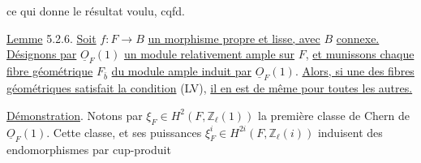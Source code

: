 \begin{center}
\end{center}
ce qui donne le résultat voulu, cqfd.



\underline{Lemme} 5.2.6. \underline{Soit} $f : F \longrightarrow B$ \underline{un morphisme propre et lisse, avec} $B$ \underline{connexe. Désignons par} $\underline{O}_F(1)$ \underline{un module relativement ample sur} $F$, \underline{et munissons chaque fibre géométrique} $F_{\bar{b}}$ \underline{du module ample induit par} $\underline{O}_F(1)$. \underline{Alors, si une des fibres géométriques satisfait la condition} (LV), \underline{il en est de même pour toutes les autres.}

\underline{Démonstration}. Notons par $\xi_F \in H^2(F,\mathbb{Z}_\ell(1))$ la première classe de Chern de $\underline{O}_F(1)$. Cette classe, et ses puissances $\xi_F^i \in H^{2i}(F,\mathbb{Z}_\ell(i))$ induisent des endomorphismes par cup-produit


